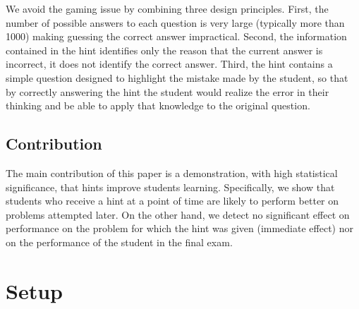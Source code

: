 \documentclass{llncs2e/llncs}
\begin{document}
We avoid the gaming issue by combining three design principles. First, the number of possible answers to each question is very large (typically more than 1000) making guessing the correct answer impractical.  Second, the information contained in the hint
identifies only the reason that the current answer is incorrect, it does not identify the correct answer. Third, the hint contains a
simple question designed to highlight the mistake made by the student, so that by correctly answering the hint the student would realize the error in their thinking and be able to apply that knowledge to the original question.

\subsection*{Contribution}

The main contribution of this paper is a demonstration, with high statistical significance, that hints improve students learning. Specifically, we show that students who receive a hint at a point of time are likely to perform better on problems attempted later. On the other hand, we detect no significant effect on performance on the problem for which the hint was given (immediate effect) nor on the performance of the student in the final exam.

\section{Setup}
\end{document}

